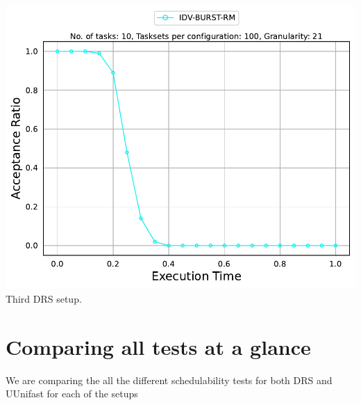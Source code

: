 \documentclass[]{article}
\begin{document}
\begin{minipage}[t]{0.48\linewidth}
		\includegraphics[width=\linewidth]{IDV-BURST-RM_3rdSetup_DRS.pdf}
		Third DRS setup.
		\vspace{0.3cm}
	\end{minipage}

	\clearpage
	\section{Comparing all tests at a glance}
{
\raggedleft We are comparing the all the different schedulability tests for both DRS and UUnifast for each of the setups \newline
}
\end{document}
